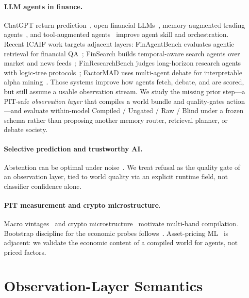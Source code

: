 \documentclass[sigconf,anonymous]{acmart}
\theoremstyle{acmdefinition}%
\theoremstyle{acmplain}%
\begin{document}
\paragraph{LLM agents in finance.}
ChatGPT return prediction~\cite{lopez2023chatgpt}, open financial LLMs~\cite{yang2023fingpt}, memory-augmented trading agents~\cite{yu2023finmem,li2023tradinggpt}, and tool-augmented agents~\cite{zhang2024finagent,yao2023react} improve agent skill and orchestration. Recent ICAIF work targets adjacent layers: FinAgentBench evaluates agentic retrieval for financial QA~\cite{choi2025finagentbench}; FinSearch builds temporal-aware search agents over market and news feeds~\cite{shen2025finsearch}; FinResearchBench judges long-horizon research agents with logic-tree protocols~\cite{sun2025finresearchbench}; FactorMAD uses multi-agent debate for interpretable alpha mining~\cite{duan2025factormad}. Those systems improve how agents fetch, debate, and are scored, but still assume a usable observation stream. We study the missing prior step---a PIT-safe \emph{observation layer} that compiles a world bundle and quality-gates action---and evaluate within-model Compiled / Ungated / Raw / Blind under a frozen schema rather than proposing another memory router, retrieval planner, or debate society.

\paragraph{Selective prediction and trustworthy AI.}
Abstention can be optimal under noise~\cite{elyaniv2010,geifman2017}. We treat refusal as the quality gate of an observation layer, tied to world quality via an explicit runtime field, not classifier confidence alone.

\paragraph{PIT measurement and crypto microstructure.}
Macro vintages~\cite{croushore2001} and crypto microstructure~\cite{makarov2020,liu2022} motivate multi-band compilation. Bootstrap discipline for the economic probes follows~\cite{white2000,politis1994,harvey2016}. Asset-pricing ML~\cite{gu2020,kelly2019,nagel2021} is adjacent: we validate the economic content of a compiled world for agents, not priced factors.

\section{Observation-Layer Semantics}
\label{sec:method}
\end{document}
